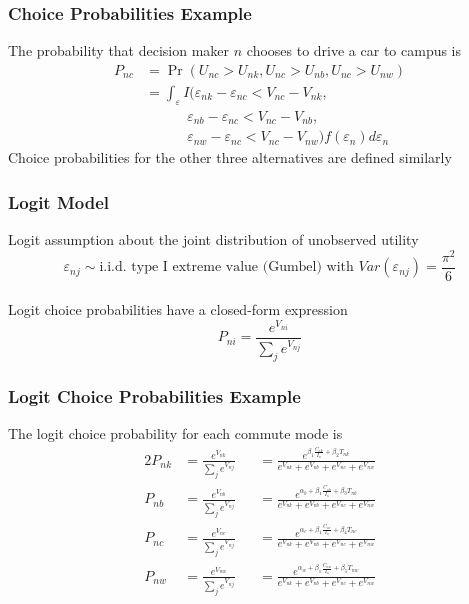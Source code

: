 \documentclass{beamer}
\begin{document}
\begin{frame}\frametitle{Choice Probabilities Example}
    The probability that decision maker $n$ chooses to drive a car to campus is
    \begin{align*}
    	P_{nc} &= \Pr(U_{nc} > U_{nk}, U_{nc} > U_{nb}, U_{nc} > U_{nw}) \\
    	&= \int_{\varepsilon} I(\varepsilon_{nk} - \varepsilon_{nc} < V_{nc} - V_{nk}, \\
    	& \qquad \quad \varepsilon_{nb} - \varepsilon_{nc} < V_{nc} - V_{nb}, \\
    	& \qquad \quad \varepsilon_{nw} - \varepsilon_{nc} < V_{nc} - V_{nw}) f(\varepsilon_n) d\varepsilon_n
    \end{align*}
    Choice probabilities for the other three alternatives are defined similarly
\end{frame}

\begin{frame}\frametitle{Logit Model}
    Logit assumption about the joint distribution of unobserved utility
	$$\varepsilon_{nj} \sim \text{i.i.d.\ type I extreme value (Gumbel) with } Var(\varepsilon_{nj}) = \frac{\pi^2}{6}$$ \\
	\vspace{2ex}
	Logit choice probabilities have a closed-form expression
	$$P_{ni} = \frac{e^{V_{ni}}}{\sum_j e^{V_{nj}}}$$
\end{frame}

\begin{frame}\frametitle{Logit Choice Probabilities Example}
    The logit choice probability for each commute mode is
    \begin{alignat*}{2}
    	P_{nk} &= \frac{e^{V_{nk}}}{\sum_j e^{V_{nj}}} &&= \frac{e^{\beta_1 \frac{C_{nk}}{I_n} + \beta_2 T_{nk}}}{e^{V_{nk}} + e^{V_{nb}} + e^{V_{nc}} + e^{V_{nw}}} \\
    	P_{nb} &= \frac{e^{V_{nb}}}{\sum_j e^{V_{nj}}} &&= \frac{e^{\alpha_b + \beta_1 \frac{C_{nb}}{I_n} + \beta_3 T_{nb}}}{e^{V_{nk}} + e^{V_{nb}} + e^{V_{nc}} + e^{V_{nw}}} \\
    	P_{nc} &= \frac{e^{V_{nc}}}{\sum_j e^{V_{nj}}} &&= \frac{e^{\alpha_c + \beta_1 \frac{C_{nc}}{I_n} + \beta_4 T_{nc}}}{e^{V_{nk}} + e^{V_{nb}} + e^{V_{nc}} + e^{V_{nw}}} \\
    	P_{nw} &= \frac{e^{V_{nw}}}{\sum_j e^{V_{nj}}} &&= \frac{e^{\alpha_w + \beta_1 \frac{C_{nw}}{I_n} + \beta_5 T_{nw}}}{e^{V_{nk}} + e^{V_{nb}} + e^{V_{nc}} + e^{V_{nw}}}
    \end{alignat*}
\end{frame}
\end{document}
